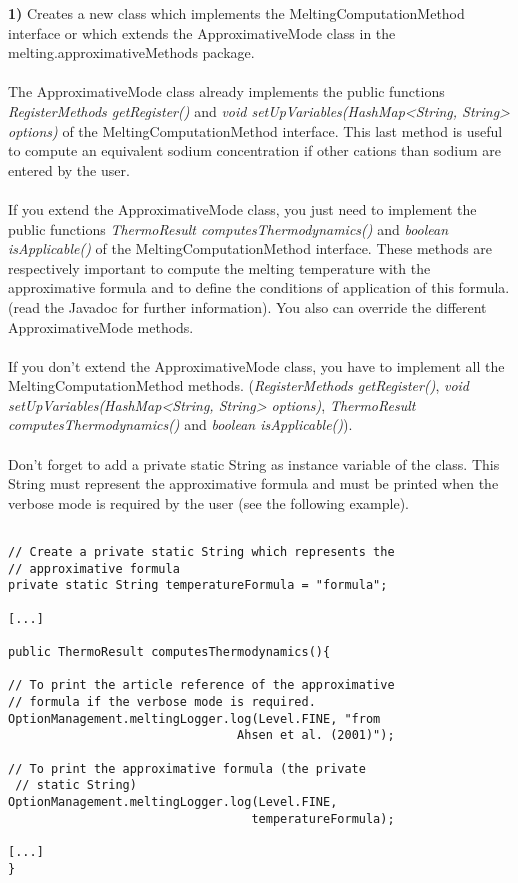 \documentclass{article}
\begin{document}
\textbf{1)} Creates a new class which implements the MeltingComputationMethod interface or which extends the 
ApproximativeMode class in the melting.approximativeMethods package. \\
\\
The ApproximativeMode class already implements the public functions \textit{RegisterMethods getRegister()} 
and \textit{void setUpVariables(HashMap<String, String> options)} of the MeltingComputationMethod interface. 
This last method is useful to compute an equivalent sodium concentration if other cations than sodium are 
entered by the user. \\
\\
If you extend the ApproximativeMode class, you just need to implement the public functions
\textit{ThermoResult computesThermodynamics()} and \textit{boolean isApplicable()} of the MeltingComputationMethod 
interface. These methods are respectively important to compute the melting temperature with the approximative 
formula and to define the conditions of application of this formula. (read the Javadoc for further information).
You also can override the different ApproximativeMode methods.\\
\\
If you don't extend the ApproximativeMode class, you have to implement all the MeltingComputationMethod
methods. (\textit{RegisterMethods getRegister()}, \textit{void setUpVariables(HashMap<String, String> options)},
\textit{ThermoResult computesThermodynamics()} and \textit{boolean isApplicable()}).\\
\\
Don't forget to add a private static String as instance variable of the class. This String must represent the
approximative formula and must be printed when the verbose mode is required by the user (see the following
example).

\begin{verbatim}

// Create a private static String which represents the 
// approximative formula
private static String temperatureFormula = "formula";

[...]

public ThermoResult computesThermodynamics(){

// To print the article reference of the approximative 
// formula if the verbose mode is required.
OptionManagement.meltingLogger.log(Level.FINE, "from 
                                Ahsen et al. (2001)");

// To print the approximative formula (the private 
 // static String)
OptionManagement.meltingLogger.log(Level.FINE, 
                                  temperatureFormula);

[...]
}

\end{verbatim}
\end{document}

